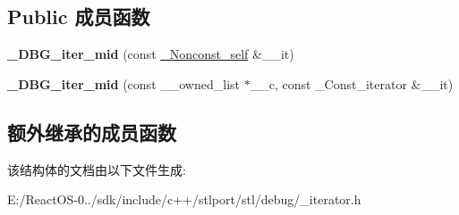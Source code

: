 \subsection*{Public 成员函数}
\begin{DoxyCompactItemize}
\item 
\mbox{\label{struct___d_b_g__iter__mid_a301345ac6a82f41256112402e3a9fa42}} 
{\bfseries \+\_\+\+D\+B\+G\+\_\+iter\+\_\+mid} (const \hyperlink{struct___d_b_g__iter__mid}{\+\_\+\+Nonconst\+\_\+self} \&\+\_\+\+\_\+it)
\item 
\mbox{\label{struct___d_b_g__iter__mid_acb3e86e603ac17ddf9d799d16bc9aee5}} 
{\bfseries \+\_\+\+D\+B\+G\+\_\+iter\+\_\+mid} (const \+\_\+\+\_\+owned\+\_\+list $\ast$\+\_\+\+\_\+c, const \+\_\+\+Const\+\_\+iterator \&\+\_\+\+\_\+it)
\end{DoxyCompactItemize}
\subsection*{额外继承的成员函数}


该结构体的文档由以下文件生成\+:\begin{DoxyCompactItemize}
\item 
E\+:/\+React\+O\+S-\/0../sdk/include/c++/stlport/stl/debug/\+\_\+iterator.\+h\end{DoxyCompactItemize}
